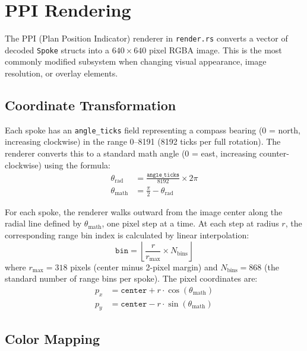 \documentclass[11pt,letterpaper]{article}
\begin{document}
\newpage
\section{PPI Rendering}
\label{sec:ppi-rendering}

The PPI (Plan Position Indicator) renderer in \texttt{render.rs} converts a vector of decoded \texttt{Spoke} structs into a $640 \times 640$ pixel RGBA image. This is the most commonly modified subsystem when changing visual appearance, image resolution, or overlay elements.

\subsection{Coordinate Transformation}
\label{subsec:coordinate-transform}

Each spoke has an \texttt{angle\_ticks} field representing a compass bearing (0 = north, increasing clockwise) in the range 0--8191 (8192 ticks per full rotation). The renderer converts this to a standard math angle (0 = east, increasing counter-clockwise) using the formula:
\begin{align}
\theta_{\text{rad}} &= \frac{\texttt{angle\_ticks}}{8192} \times 2\pi \\
\theta_{\text{math}} &= \frac{\pi}{2} - \theta_{\text{rad}}
\end{align}

For each spoke, the renderer walks outward from the image center along the radial line defined by $\theta_{\text{math}}$, one pixel step at a time. At each step at radius $r$, the corresponding range bin index is calculated by linear interpolation:
\begin{equation}
\texttt{bin} = \left\lfloor \frac{r}{r_{\max}} \times N_{\text{bins}} \right\rfloor
\end{equation}
where $r_{\max} = 318$ pixels (center minus 2-pixel margin) and $N_{\text{bins}} = 868$ (the standard number of range bins per spoke). The pixel coordinates are:
\begin{align}
p_x &= \texttt{center} + r \cdot \cos(\theta_{\text{math}}) \\
p_y &= \texttt{center} - r \cdot \sin(\theta_{\text{math}})
\end{align}

\subsection{Color Mapping}
\label{subsec:color-mapping}
\end{document}
